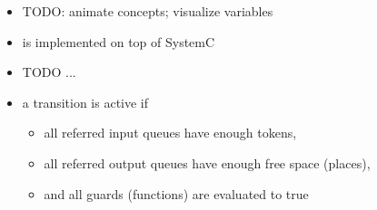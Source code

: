\begin{frame}[t]
\begin{figure}
\centering
\resizebox{1\columnwidth}{!}{}
\end{figure}
\begin{itemize}
\item TODO: animate concepts; visualize variables
\end{itemize}
\end{frame}







\begin{frame}[t]
\begin{itemize}
\item \SysteMoC{} is implemented on top of SystemC
\end{itemize}
\begin{figure}
\centering
\resizebox{0.75\columnwidth}{!}{}
\end{figure}
\end{frame}






\begin{frame}[t]
\begin{itemize}
\item TODO ...
\item a transition is active if 
\begin{itemize}
\item all referred input queues have enough tokens,
\item all referred output queues have enough free space (places),
\item and all guards (functions) are evaluated to true
\end{itemize}
\end{itemize}
\end{frame}





